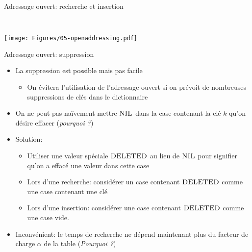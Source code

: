 \begin{frame}{Adressage ouvert: recherche et insertion}

\begin{center}
~~~

\end{center}

\centerline{\texttt{[image: Figures/05-openaddressing.pdf]}}

\end{frame}

\begin{frame}{Adressage ouvert: suppression}
\begin{itemize}
\item La suppression est possible mais pas facile
\begin{itemize}
\item On évitera l'utilisation de l'adressage ouvert si on prévoit de nombreuses suppressions de clés dans le dictionnaire
\end{itemize}
\item On ne peut pas naïvement mettre $\textnormal{\scshape NIL}$ dans la case contenant la clé $k$ qu'on désire effacer (\emph{pourquoi ?})
\item Solution:
\begin{itemize}
\item Utiliser une valeur spéciale $\textnormal{\scshape DELETED}$ au lieu
  de $\textnormal{\scshape NIL}$ pour signifier qu'on a effacé une valeur dans cette case
\item Lors d'une recherche: considérer un case contenant
  $\textnormal{\scshape DELETED}$ comme une case contenant une clé
\item Lors d'une insertion: considérer une case contenant $\textnormal{\scshape DELETED}$ comme une case vide.
\end{itemize}
\item Inconvénient: le temps de recherche ne dépend maintenant plus du facteur de charge $\alpha$ de la table (\emph{Pourquoi ?})
\end{itemize}

\end{frame}

